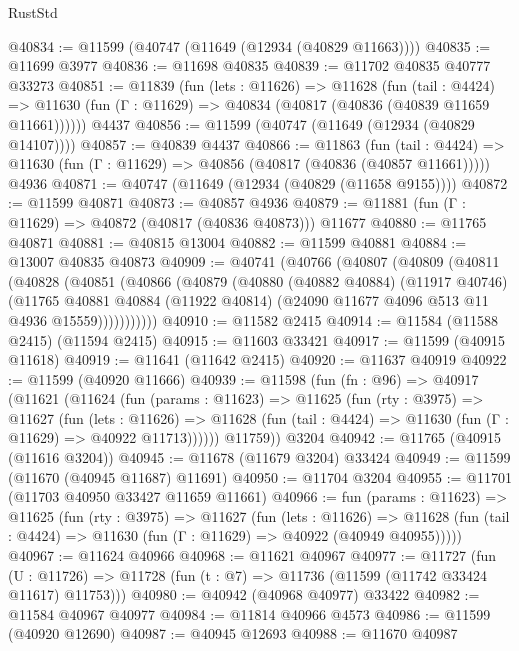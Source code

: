 \begin{lexlean}{RustStd}
\begin{coremodule}
@40834 := @11599 (@40747 (@11649 (@12934 (@40829 @11663))))
@40835 := @11699 @3977
@40836 := @11698 @40835
@40839 := @11702 @40835 @40777 @33273
@40851 := @11839
    (fun (lets : @11626) =>
    @11628
      (fun (tail : @4424) =>
      @11630 (fun (Γ : @11629) => @40834 (@40817 (@40836 (@40839 @11659 @11661))))))
    @4437
@40856 := @11599 (@40747 (@11649 (@12934 (@40829 @14107))))
@40857 := @40839 @4437
@40866 := @11863
    (fun (tail : @4424) => @11630 (fun (Γ : @11629) => @40856 (@40817 (@40836 (@40857 @11661)))))
    @4936
@40871 := @40747 (@11649 (@12934 (@40829 (@11658 @9155))))
@40872 := @11599 @40871
@40873 := @40857 @4936
@40879 := @11881 (fun (Γ : @11629) => @40872 (@40817 (@40836 @40873))) @11677
@40880 := @11765 @40871
@40881 := @40815 @13004
@40882 := @11599 @40881
@40884 := @13007 @40835 @40873
@40909 := @40741
    (@40766
      (@40807
        (@40809
          (@40811
            (@40828
              (@40851
                (@40866
                  (@40879
                    (@40880
                      (@40882 @40884)
                      (@11917 @40746)
                      (@11765
                        @40881
                        @40884
                        (@11922 @40814)
                        (@24090 @11677 @4096 @513 @11 @4936 @15559)))))))))))
@40910 := @11582 @2415
@40914 := @11584 (@11588 @2415) (@11594 @2415)
@40915 := @11603 @33421
@40917 := @11599 (@40915 @11618)
@40919 := @11641 (@11642 @2415)
@40920 := @11637 @40919
@40922 := @11599 (@40920 @11666)
@40939 := @11598
    (fun (fn : @96) =>
    @40917
      (@11621
        (@11624
          (fun (params : @11623) =>
          @11625
            (fun (rty : @3975) =>
            @11627
              (fun (lets : @11626) =>
              @11628 (fun (tail : @4424) => @11630 (fun (Γ : @11629) => @40922 @11713))))))
        @11759))
    @3204
@40942 := @11765 (@40915 (@11616 @3204))
@40945 := @11678 (@11679 @3204) @33424
@40949 := @11599 (@11670 (@40945 @11687) @11691)
@40950 := @11704 @3204
@40955 := @11701 (@11703 @40950 @33427 @11659 @11661)
@40966 := fun (params : @11623) =>
  @11625
    (fun (rty : @3975) =>
    @11627
      (fun (lets : @11626) =>
      @11628 (fun (tail : @4424) => @11630 (fun (Γ : @11629) => @40922 (@40949 @40955)))))
@40967 := @11624 @40966
@40968 := @11621 @40967
@40977 := @11727
    (fun (U : @11726) => @11728 (fun (t : @7) => @11736 (@11599 (@11742 @33424 @11617) @11753)))
@40980 := @40942 (@40968 @40977) @33422
@40982 := @11584 @40967 @40977
@40984 := @11814 @40966 @4573
@40986 := @11599 (@40920 @12690)
@40987 := @40945 @12693
@40988 := @11670 @40987

\end{coremodule}
\end{lexlean}
